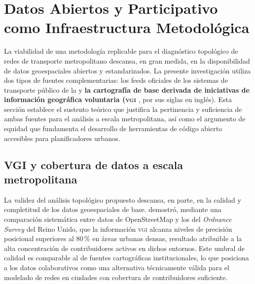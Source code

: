 
\section{Datos Abiertos y \gis{} Participativo como Infraestructura Metodológica}
\label{sec:sig-datos-abiertos}

La viabilidad de una metodología replicable para el diagnóstico topológico de
redes de transporte metropolitano descansa, en gran medida, en la disponibilidad
de datos geoespaciales abiertos y estandarizados. La presente investigación
utiliza dos tipos de fuentes complementarias: los feeds \gtfs{} oficiales de los
sistemas de transporte público de la \zmvm{} y
\textbf{la cartografía de base derivada de iniciativas de información geográfica voluntaria (\textsc{vgi}}
, por sus siglas en inglés). Esta sección establece el sustento teórico que
justifica la pertinencia y suficiencia de ambas fuentes para el análisis a
escala metropolitana, así como el argumento de equidad que fundamenta el
desarrollo de herramientas de código abierto accesibles para planificadores
urbanos.

\subsection{VGI y cobertura de datos a escala metropolitana}
\label{subsec:vgi-cobertura}

La validez del análisis topológico propuesto descansa, en parte, en la calidad y
completitud de los datos geoespaciales de base. \citet{haklay2010good} demostró,
mediante una comparación sistemática entre datos de OpenStreetMap y los del
\textit{Ordnance Survey} del Reino Unido, que la información \textsc{vgi}
alcanza niveles de precisión posicional superiores al 80\,\% en áreas urbanas
densas, resultado atribuible a la alta concentración de contribuidores activos
en dichos entornos. Este umbral de calidad es comparable al de fuentes
cartográficas institucionales, lo que posiciona a los datos colaborativos como
una alternativa técnicamente válida para el modelado de redes en ciudades con
cobertura de contribuidores suficiente.

